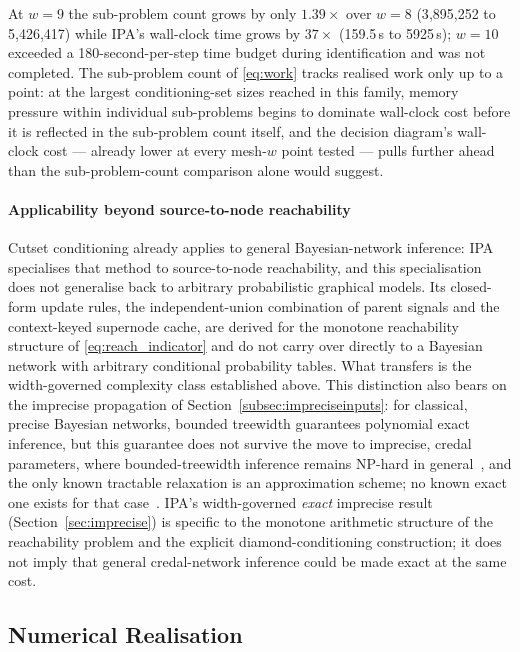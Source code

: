 \documentclass[preprint,12pt]{elsarticle}
\begin{document}
At $w{=}9$ the sub-problem count grows by only $1.39\times$ over $w{=}8$ (3{,}895{,}252 to 5{,}426{,}417) while IPA's wall-clock time grows by $37\times$ (159.5\,s to 5925\,s); $w{=}10$ exceeded a 180-second-per-step time budget during identification and was not completed. The sub-problem count of \eqref{eq:work} tracks realised work only up to a point: at the largest conditioning-set sizes reached in this family, memory pressure within individual sub-problems begins to dominate wall-clock cost before it is reflected in the sub-problem count itself, and the decision diagram's wall-clock cost — already lower at every mesh-$w$ point tested — pulls further ahead than the sub-problem-count comparison alone would suggest.

\paragraph{Applicability beyond source-to-node reachability} Cutset conditioning already applies to general Bayesian-network inference: IPA specialises that method to source-to-node reachability, and this specialisation does not generalise back to arbitrary probabilistic graphical models. Its closed-form update rules, the independent-union combination of parent signals and the context-keyed supernode cache, are derived for the monotone reachability structure of \eqref{eq:reach_indicator} and do not carry over directly to a Bayesian network with arbitrary conditional probability tables. What transfers is the width-governed complexity class established above. This distinction also bears on the imprecise propagation of Section~\ref{subsec:impreciseinputs}: for classical, precise Bayesian networks, bounded treewidth guarantees polynomial exact inference, but this guarantee does not survive the move to imprecise, credal parameters, where bounded-treewidth inference remains NP-hard in general~\cite{maua_thirty_2020}, and the only known tractable relaxation is an approximation scheme; no known exact one exists for that case~\cite{fagiuoli_2u_1998}. IPA's width-governed \emph{exact} imprecise result (Section~\ref{sec:imprecise}) is specific to the monotone arithmetic structure of the reachability problem and the explicit diamond-conditioning construction; it does not imply that general credal-network inference could be made exact at the same cost.

\subsection{Numerical Realisation}\label{sec:numerical}
\end{document}
